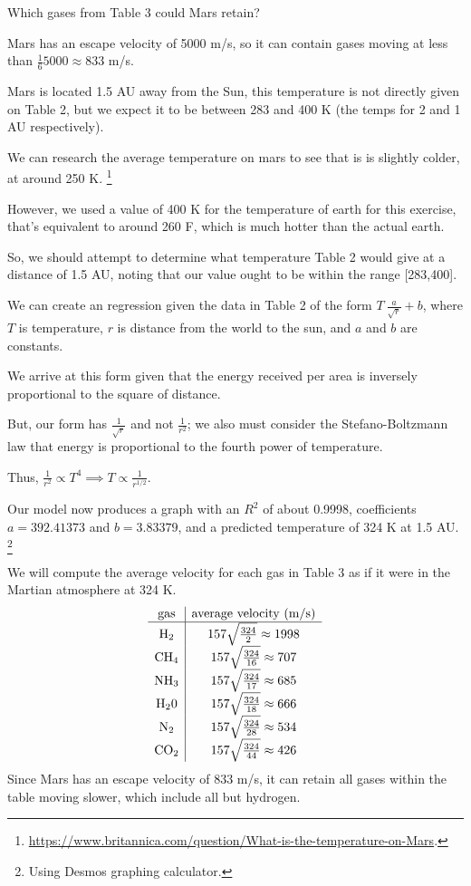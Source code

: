 \documentclass[../astro_4]{subfiles}
\begin{document}
\begin{problem}
Which gases from Table 3 could Mars retain?
\end{problem}
Mars has an escape velocity of 5000 m/s, so it can contain gases moving at less than $\frac{1}{6}5000 \approx 833$ m/s.

Mars is located 1.5 AU away from the Sun, this temperature is not directly given on Table 2,
but we expect it to be between 283 and 400 K (the temps for 2 and 1 AU respectively).

We can research the average temperature on mars to see that is is slightly colder, at around 250 K.
\footnote{\url{https://www.britannica.com/question/What-is-the-temperature-on-Mars}.}

However, we used a value of 400 K for the temperature of earth for this exercise, that's equivalent to around 260 F, which is much hotter than the actual earth.

So, we should attempt to determine what temperature Table 2 would give at a distance of 1.5 AU, noting that our value ought to be within the range [283,400].

We can create an regression given the data in Table 2 of the form $T~\frac{a}{\sqrt{r}}+b$, where $T$ is temperature, $r$ is distance from the world to the sun, and $a$ and $b$ are constants.

We arrive at this form given that the energy received per area is inversely proportional to the square of distance.

But, our form has $\frac{1}{\sqrt{r}}$ and not $\frac{1}{r^2}$; we also must consider the Stefano-Boltzmann law that energy is proportional to the fourth power of temperature.

Thus, $\frac{1}{r^2}\propto T^4 \implies T \propto \frac{1}{r^{1 / 2}}$.

Our model now produces a graph with an $R^2$ of about 0.9998, coefficients $a=392.41373$ and $b=3.83379$, and a predicted temperature of 324 K at 1.5 AU.
\footnote{Using Desmos graphing calculator.}

We will compute the average velocity for each gas in Table 3 as if it were in the Martian atmosphere at 324 K.
\[
	\begin{array}{c | c}
		\text{gas}         & \text{average velocity (m/s)}           \\
		\hline
		\text{H}_2         & 157\sqrt{\frac{324}{2}} \approx 1998    \\
		\text{CH}_4        & 157\sqrt{\frac{324}{16}} \approx 707    \\
		\text{NH}_3        & 157\sqrt{\frac{324}{17}} \approx    685 \\
		\text{H}_2\text{0} & 157\sqrt{\frac{324}{18}} \approx   666  \\
		\text{N}_2         & 157\sqrt{\frac{324}{28}} \approx   534  \\
		\text{CO}_2        & 157\sqrt{\frac{324}{44}} \approx  426   \\
	\end{array}
\]
Since Mars has an escape velocity of 833 m/s, it can retain all gases within the table moving slower, which include all but hydrogen.
\end{document}
